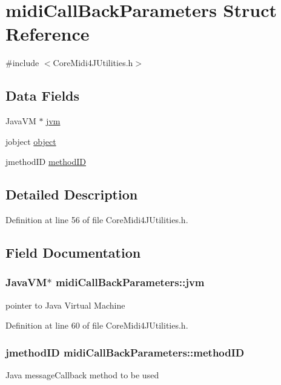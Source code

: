 \hypertarget{structmidi_call_back_parameters}{
\section{midiCallBackParameters Struct Reference}
\label{structmidi_call_back_parameters}
}


{\ttfamily \#include $<$CoreMidi4JUtilities.h$>$}

\subsection*{Data Fields}
\begin{DoxyCompactItemize}
\item 
JavaVM $\ast$ \hyperlink{structmidi_call_back_parameters_a982d768761058a735ec9483e5b70cf1f}{jvm}
\item 
jobject \hyperlink{structmidi_call_back_parameters_a5c3e9c2980b21482abffba74d19bb2eb}{object}
\item 
jmethodID \hyperlink{structmidi_call_back_parameters_a7bd47f3e03edc722ce0a9a29419037ba}{methodID}
\end{DoxyCompactItemize}


\subsection{Detailed Description}


Definition at line 56 of file CoreMidi4JUtilities.h.



\subsection{Field Documentation}
\hypertarget{structmidi_call_back_parameters_a982d768761058a735ec9483e5b70cf1f}{
\subsubsection[{jvm}]{\setlength{\rightskip}{0pt plus 5cm}JavaVM$\ast$ {\bf midiCallBackParameters::jvm}}}
\label{structmidi_call_back_parameters_a982d768761058a735ec9483e5b70cf1f}
pointer to Java Virtual Machine 

Definition at line 60 of file CoreMidi4JUtilities.h.

\hypertarget{structmidi_call_back_parameters_a7bd47f3e03edc722ce0a9a29419037ba}{
\subsubsection[{methodID}]{\setlength{\rightskip}{0pt plus 5cm}jmethodID {\bf midiCallBackParameters::methodID}}}
\label{structmidi_call_back_parameters_a7bd47f3e03edc722ce0a9a29419037ba}
Java messageCallback method to be used 

